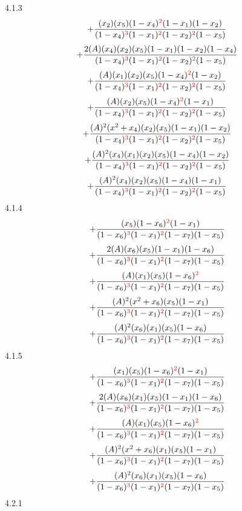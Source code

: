 \documentclass{article}
\begin{document}
4.1.3
\[+\frac{(x_2)(x_5)(1-x_4)^{\textcolor{red}{2}}(1-x_1)(1-x_2)}{(1-x_4)^{\textcolor{red}{3}}(1-x_1)^{\textcolor{red}{2}}(1-x_2)^{\textcolor{red}{2}}(1-x_5)}\]\[+\frac{2(A)(x_4)(x_2)(x_5)(1-x_1)(1-x_2)(1-x_4)}{(1-x_4)^{\textcolor{red}{3}}(1-x_1)^{\textcolor{red}{2}}(1-x_2)^{\textcolor{red}{2}}(1-x_5)}\]\[+\frac{(A)(x_1)(x_2)(x_5)(1-x_4)^{\textcolor{red}{2}}(1-x_2)}{(1-x_4)^{\textcolor{red}{3}}(1-x_1)^{\textcolor{red}{2}}(1-x_2)^{\textcolor{red}{2}}(1-x_5)}\]\[+\frac{(A)(x_2)(x_5)(1-x_4)^{\textcolor{red}{2}}(1-x_1)}{(1-x_4)^{\textcolor{red}{3}}(1-x_1)^{\textcolor{red}{2}}(1-x_2)^{\textcolor{red}{2}}(1-x_5)}\]\[+\frac{(A)^{2}(x^{2}+x_4)(x_2)(x_5)(1-x_1)(1-x_2)}{(1-x_4)^{\textcolor{red}{3}}(1-x_1)^{\textcolor{red}{2}}(1-x_2)^{\textcolor{red}{2}}(1-x_5)}\]\[+\frac{(A)^{2}(x_4)(x_1)(x_2)(x_5)(1-x_4)(1-x_2)}{(1-x_4)^{\textcolor{red}{3}}(1-x_1)^{\textcolor{red}{2}}(1-x_2)^{\textcolor{red}{2}}(1-x_5)}\]\[+\frac{(A)^{2}(x_4)(x_2)(x_5)(1-x_4)(1-x_1)}{(1-x_4)^{\textcolor{red}{3}}(1-x_1)^{\textcolor{red}{2}}(1-x_2)^{\textcolor{red}{2}}(1-x_5)}\]
4.1.4
\[+\frac{(x_5)(1-x_6)^{\textcolor{red}{2}}(1-x_1)}{(1-x_6)^{\textcolor{red}{3}}(1-x_1)^{\textcolor{red}{2}}(1-x_7)(1-x_5)}\]\[+\frac{2(A)(x_6)(x_5)(1-x_1)(1-x_6)}{(1-x_6)^{\textcolor{red}{3}}(1-x_1)^{\textcolor{red}{2}}(1-x_7)(1-x_5)}\]\[+\frac{(A)(x_1)(x_5)(1-x_6)^{\textcolor{red}{2}}}{(1-x_6)^{\textcolor{red}{3}}(1-x_1)^{\textcolor{red}{2}}(1-x_7)(1-x_5)}\]\[+\frac{(A)^{2}(x^{2}+x_6)(x_5)(1-x_1)}{(1-x_6)^{\textcolor{red}{3}}(1-x_1)^{\textcolor{red}{2}}(1-x_7)(1-x_5)}\]\[+\frac{(A)^{2}(x_6)(x_1)(x_5)(1-x_6)}{(1-x_6)^{\textcolor{red}{3}}(1-x_1)^{\textcolor{red}{2}}(1-x_7)(1-x_5)}\]
4.1.5
\[+\frac{(x_1)(x_5)(1-x_6)^{\textcolor{red}{2}}(1-x_1)}{(1-x_6)^{\textcolor{red}{3}}(1-x_1)^{\textcolor{red}{2}}(1-x_7)(1-x_5)}\]\[+\frac{2(A)(x_6)(x_1)(x_5)(1-x_1)(1-x_6)}{(1-x_6)^{\textcolor{red}{3}}(1-x_1)^{\textcolor{red}{2}}(1-x_7)(1-x_5)}\]\[+\frac{(A)(x_1)(x_5)(1-x_6)^{\textcolor{red}{2}}}{(1-x_6)^{\textcolor{red}{3}}(1-x_1)^{\textcolor{red}{2}}(1-x_7)(1-x_5)}\]\[+\frac{(A)^{2}(x^{2}+x_6)(x_1)(x_5)(1-x_1)}{(1-x_6)^{\textcolor{red}{3}}(1-x_1)^{\textcolor{red}{2}}(1-x_7)(1-x_5)}\]\[+\frac{(A)^{2}(x_6)(x_1)(x_5)(1-x_6)}{(1-x_6)^{\textcolor{red}{3}}(1-x_1)^{\textcolor{red}{2}}(1-x_7)(1-x_5)}\]
4.2.1
\end{document}
